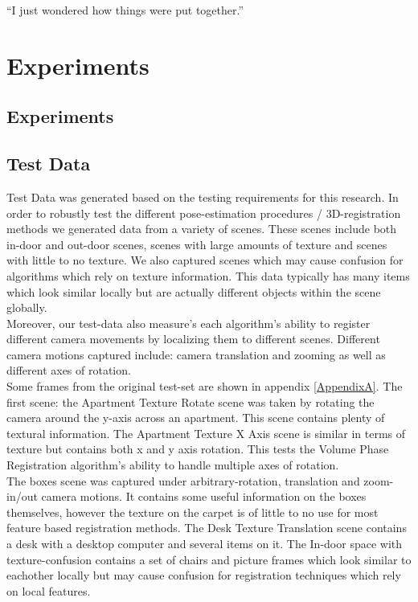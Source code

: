 \begin{savequote}[8cm]
  ``I just wondered how things were put together.''
\end{savequote}
\makeatletter
\chapter{Experiments}

\section{Experiments}

\section{Test Data}

Test Data was generated based on the testing requirements for this research. In order to robustly test the different pose-estimation procedures / 3D-registration methods we generated data from a variety of scenes. These scenes include both in-door and out-door scenes, scenes with large amounts of texture and scenes with little to no texture. We also captured scenes which may cause confusion for algorithms which rely on texture information. This data typically has many items which look similar locally but are actually different objects within the scene globally. \\

Moreover, our test-data also measure's each algorithm's ability to register different camera movements by localizing them to different scenes. Different camera motions captured include: camera translation and zooming as well as different axes of rotation. \\

Some frames from the original test-set are shown in appendix \ref{AppendixA}. The first scene: the Apartment Texture Rotate scene was taken by rotating the camera around the y-axis across an apartment. This scene contains plenty of textural information. The Apartment Texture X Axis scene is similar in terms of texture but contains both x and y axis rotation. This tests the Volume Phase Registration algorithm's ability to handle multiple axes of rotation. \\

The boxes scene was captured under arbitrary-rotation, translation and zoom-in/out camera motions. It contains some useful information on the boxes themselves, however the texture on the carpet is of little to no use for most feature based registration methods. The Desk Texture Translation scene contains a desk with a desktop computer and several items on it. The In-door space with texture-confusion contains a set of chairs and picture frames which look similar to eachother locally but may cause confusion for registration techniques which rely on local features.  \\

